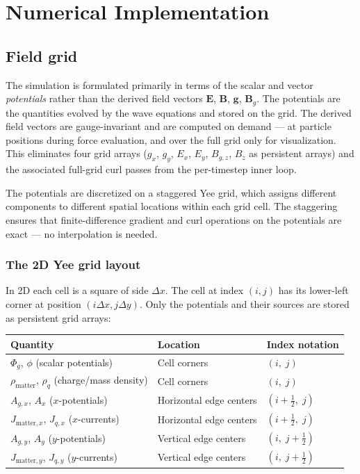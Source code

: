 \documentclass[11pt,a4paper]{article}
\newcommand{\vv}[1]{\mathbf{#1}}
\newcommand{\Phig}{\Phi_g}
\begin{document}
\section{Numerical Implementation}
\label{sec:numerical}

\subsection{Field grid}

The simulation is formulated primarily in terms of the scalar and vector \emph{potentials} rather than the derived field vectors $\vv{E}$, $\vv{B}$, $\vv{g}$, $\vv{B}_g$.  The potentials are the quantities evolved by the wave equations and stored on the grid.  The derived field vectors are gauge-invariant and are computed on demand --- at particle positions during force evaluation, and over the full grid only for visualization.  This eliminates four grid arrays ($g_x$, $g_y$, $E_x$, $E_y$, $B_{g,z}$, $B_z$ as persistent arrays) and the associated full-grid curl passes from the per-timestep inner loop.

The potentials are discretized on a staggered Yee grid, which assigns different components to different spatial locations within each grid cell.  The staggering ensures that finite-difference gradient and curl operations on the potentials are exact --- no interpolation is needed.

\subsubsection*{The 2D Yee grid layout}

In 2D each cell is a square of side $\Delta x$.  The cell at index $(i,j)$ has its lower-left corner at position $(i\Delta x, j\Delta y)$.  Only the potentials and their sources are stored as persistent grid arrays:

\begin{center}
\begin{tabular}{@{}L{5cm}L{3cm}L{5cm}@{}}
\toprule
\textbf{Quantity} & \textbf{Location} & \textbf{Index notation} \\
\midrule
$\Phig$, $\phi$ (scalar potentials) & Cell corners & $(i,\; j)$ \\
$\rho_{\mathrm{matter}}$, $\rho_q$ (charge/mass density) & Cell corners & $(i,\; j)$ \\
$A_{g,x}$, $A_x$ ($x$-potentials) & Horizontal edge centers & $(i+\tfrac{1}{2},\; j)$ \\
$J_{\mathrm{matter},x}$, $J_{q,x}$ ($x$-currents) & Horizontal edge centers & $(i+\tfrac{1}{2},\; j)$ \\
$A_{g,y}$, $A_y$ ($y$-potentials) & Vertical edge centers & $(i,\; j+\tfrac{1}{2})$ \\
$J_{\mathrm{matter},y}$, $J_{q,y}$ ($y$-currents) & Vertical edge centers & $(i,\; j+\tfrac{1}{2})$ \\
\bottomrule
\end{tabular}
\end{center}
\end{document}
